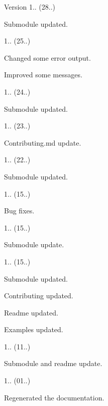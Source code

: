 \begin{DoxyVersion}{Version}
1.. (28..)
\begin{DoxyItemize}
\item Submodule updated. 
\end{DoxyItemize}

1.. (25..)
\begin{DoxyItemize}
\item Changed some error output.
\item Improved some messages. 
\end{DoxyItemize}

1.. (24..)
\begin{DoxyItemize}
\item Submodule updated. 
\end{DoxyItemize}

1.. (23..)
\begin{DoxyItemize}
\item Contributing.\+md update. 
\end{DoxyItemize}

1.. (22..)
\begin{DoxyItemize}
\item Submodule updated. 
\end{DoxyItemize}

1.. (15..)
\begin{DoxyItemize}
\item Bug fixes. 
\end{DoxyItemize}

1.. (15..)
\begin{DoxyItemize}
\item Submodule update. 
\end{DoxyItemize}

1.. (15..)
\begin{DoxyItemize}
\item Submodule updated.
\item Contributing updated.
\item Readme updated.
\item Examples updated. 
\end{DoxyItemize}

1.. (11..)
\begin{DoxyItemize}
\item Submodule and readme update. 
\end{DoxyItemize}

1.. (01..)
\begin{DoxyItemize}
\item Regenerated the documentation. 
\end{DoxyItemize}


\end{DoxyVersion}

